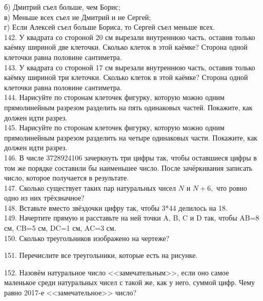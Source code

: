б) Дмитрий съел больше, чем Борис;\\
в) Меньше всех съел не Дмитрий и не Сергей;\\
г) Если Алексей съел больше Бориса, то Сергей съел меньше всех.\\
142. У квадрата со стороной 20 см вырезали внутреннюю часть, оставив только каёмку шириной две клеточки. Сколько клеток в этой каёмке? Сторона одной клеточки равна половине сантиметра.\\
143. У квадрата со стороной 17 см вырезали внутреннюю часть, оставив только каёмку шириной три клеточки. Сколько клеток в этой каёмке? Сторона одной клеточки равна половине сантиметра.\\
144. Нарисуйте по сторонам клеточек фигурку, которую можно одним прямолинейным разрезом разделить на пять одинаковых частей. Покажите, как должен идти разрез.\\
145. Нарисуйте по сторонам клеточек фигурку, которую можно одним прямолинейным разрезом разделить на четыре одинаковых части. Покажите, как должен идти разрез.\\
146. В числе 3728924106 зачеркнуть три цифры так, чтобы оставшиеся цифры в том же порядке составили бы наименьшее число. После зачёркивания записать число, которое получается в результате.\\
147. Сколько существует таких пар натуральных чисел $N$ и $N+6,$ что ровно одно из них трёхзначное?\\
148. Вставьте вместо звёздочки цифру так, чтобы 3*44 делилось на 18.\\
149. Начертите прямую и расставьте на ней точки A, B, C и D так, чтобы AB=8 см, CB=5 см, DC=1 см, AC=3 см.\\
150. Сколько треугольников изображено на чертеже?
\begin{center}
\begin{figure}[ht!]
\end{figure}
\end{center}
151. Перечислите все треугольники, которые есть на рисунке.
\begin{center}
\begin{figure}[ht!]
\end{figure}
\end{center}
152. Назовём натуральное число <<замечательным>>, если оно самое маленькое среди натуральных чисел с такой же, как у него, суммой цифр. Чему равно 2017-е <<замечательное>> число?\\

